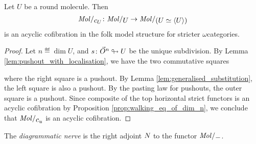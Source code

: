 \begin{prop} \label{prop:molecin_send_Jcomp_to_acof}
    Let \( U \) be a round molecule.
    Then
    \begin{equation*}
        \molecin{c_U} \colon \molecin{U} \to \molecin{(U \simeq \compos{U})}
    \end{equation*}
    is an acyclic cofibration in the folk model structure for stricter \( \omega \)\nbd categories.
\end{prop}
\begin{proof}
    Let \( n \eqdef \dim U \), and \( s \colon \vec{O}^{n} \looparrowright U \) be the unique subdivision.
    By Lemma \ref{lem:pushout_with_localisation}, we have the two commutative squares
    \begin{center}
    \end{center}
    where the right square is a pushout.
    By Lemma \ref{lem:generalised_substitution}, the left square is also a pushout.
    By the pasting law for pushouts, the outer square is a pushout.
    Since composite of the top horizontal strict functors is an acyclic cofibration by Proposition \ref{prop:walking_eq_of_dim_n}, we conclude that \( \molecin{c_u} \) is an acyclic cofibration.
\end{proof}

\begin{dfn} 
    The \emph{diagrammatic nerve} is the right adjoint \( N_{} \) to the functor \( \molecin{-} \).
\end{dfn}


